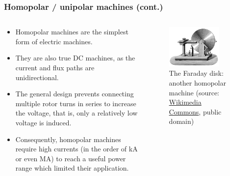 \begin{frame}
	\frametitle{Homopolar / unipolar machines (cont.)}
    \begin{columns}
		\begin{column}{0.5\textwidth}
            \begin{itemize}
                \item  Homopolar machines are the simplest form of electric machines.
                \item They are also true DC machines, as the current and flux paths are unidirectional.
                \item<2-> The general design prevents connecting multiple rotor turns in series to increase the voltage, that is, only a relatively low voltage is induced.
                \item<3-> Consequently, homopolar machines require high currents (in the order of  \si{\kilo\ampere} or even \si{\mega\ampere}) to reach a useful power range which limited their application.
            \end{itemize}
		\end{column}
        \hfill
		\begin{column}{0.49\textwidth}
			\begin{figure}
				\centering
				\includegraphics[width=0.8\textwidth]{fig/lec03/Faraday_disk_generator.jpg}
				\caption{The Faraday disk: another homopolar machine (source: \href{https://commons.wikimedia.org/wiki/File:Faraday_disk_generator.jpg}{Wikimedia Commons}, public domain)}
			\end{figure}
		\end{column}
		\end{columns}
\end{frame}

